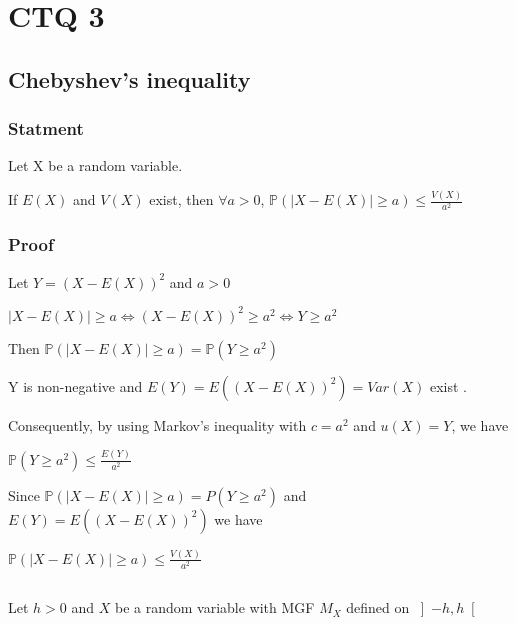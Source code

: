 \documentclass[11pt]{article}
\def\gt{>}
\begin{document}
\newpage


\section{CTQ 3}
\subsection{Chebyshev's inequality}
\subsubsection{Statment}

Let X be a random variable.

If $E(X)$ and $V(X)$ exist, then $\forall a \gt 0 $, $\mathbb {P}(\left| X-E(X) \right|\ge a )\le \frac{V(X)}{a^2}$
\subsubsection{Proof}

Let $Y=(X-E(X))^2$ and $ a \gt 0$

$\left| X-E(X) \right| \ge a \iff  (X-E(X))^2\ge a^2 \iff Y \ge a^2$ 

Then $\mathbb {P}(\left| X-E(X) \right| \ge a)=\mathbb {P}(Y \ge a^2)$



Y is non-negative  and $E(Y)=E((X-E(X))^2)=Var(X)$ exist .

Consequently, by using Markov's inequality with $c=a^2$ and $u(X)=Y$, we have

$\mathbb {P}(Y\ge a^2) \le \frac{E(Y)}{a^2}$
 
Since $\mathbb {P}(\left| X-E(X) \right| \ge a)=P(Y \ge a^2)$  and 
$E(Y)=E((X-E(X))^2)$ we have

$\mathbb {P}(\left| X-E(X) \right| \ge a )\le \frac{V(X)}{a^2}$

\subsection{}

Let $h \gt 0$  and \(X\) be a random variable with MGF $M_X$ defined on $\left]-h, h\right[$
\end{document}
